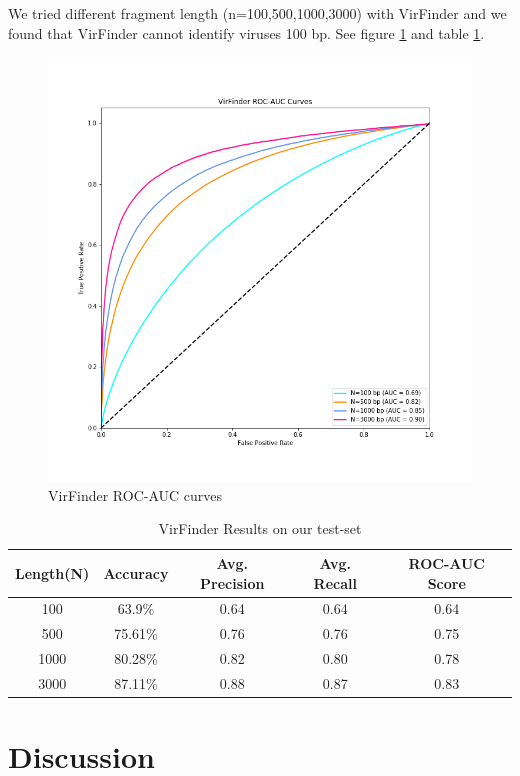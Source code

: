 \documentclass[conference]{IEEEtran}
\begin{document}
We tried different fragment length (n=100,500,1000,3000) with VirFinder and we found that VirFinder cannot identify viruses 100 bp. See figure \ref{fig:roc_auc_virfinder} and table \ref{table:virfinder_results}.

\begin{figure}
	\centering
	\includegraphics[width=\columnwidth]{imgs/roc_auc.png}
	\caption{VirFinder ROC-AUC curves}
	\label{fig:roc_auc_virfinder}
\end{figure}


\begin{table}[h!]
	\centering
	\begin{tabular}{||c c c c c||} 
		Length(N) &	Accuracy & Avg. Precision & Avg. Recall &	ROC-AUC Score \\ [0.5ex] 
		\hline\hline
		100 &	63.9\%	& 0.64 & 0.64 & 0.64 \\
		500 &	75.61\% &	0.76 & 0.76 & 0.75 \\
		1000 &	80.28\% & 0.82 & 0.80 & 0.78 \\
		3000 &	87.11\% & 0.88 & 0.87 & 0.83\\[1ex]
	\end{tabular}
	\caption{VirFinder Results on our test-set}
	\label{table:virfinder_results}
\end{table}

\section{Discussion}
\end{document}
